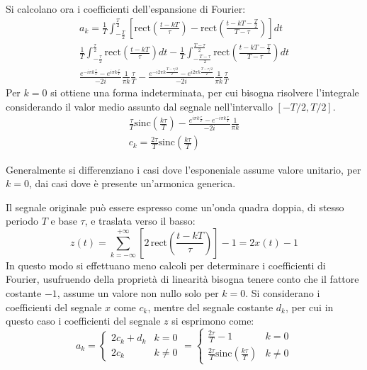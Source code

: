 \documentclass{article}
\numberwithin{equation}{subsection}
\begin{document}
Si calcolano ora i coefficienti dell'espansione di Fourier:
\begin{gather*}
    a_k=\displaystyle\frac{1}{T}\int_{-\frac{T}{2}}^{\frac{T}{2}}\left[\mbox{rect}\left(\frac{t-kT}{\tau}\right)-\mbox{rect}\left(\frac{t-kT-\frac{T}{2}}{T-\tau}\right)\right]dt\\
    \displaystyle\frac{1}{T}\int_{-\frac{\tau}{2}}^{\frac{\tau}{2}}\mbox{rect}\left(\frac{t-kT}{\tau}\right)dt-\frac{1}{T}\int_{-\frac{T-\tau}{2}}^{\frac{T-\tau}{2}}\mbox{rect}\left(\frac{t-kT-\frac{T}{2}}{T-\tau}\right)dt\\
    \displaystyle\frac{e^{-i\pi k\frac{\tau}{T}}-e^{i\pi k\frac{\tau}{T}}}{-2i}\frac{1}{\pi k}\frac{\tau}{T}-\frac{e^{-i2\pi k\frac{T-\tau/2}{T}}-e^{i2\pi k\frac{T-\tau/2}{T}}}{-2i}\frac{1}{\pi k}\frac{\tau}{T}
\end{gather*}
Per $k=0$ si ottiene una forma indeterminata, per cui bisogna risolvere l'integrale considerando il valor medio assunto dal segnale nell'intervallo $\left[-T/2,T/2\right]$. 
\begin{gather*}
    \displaystyle\frac{\tau}{T}\mbox{sinc}\left(\frac{k\tau}{T}\right)-\frac{e^{i\pi k\frac{\tau}{T}}-e^{-i\pi k\frac{\tau}{T}}}{-2i}\frac{1}{\pi k}\\
    c_k=\displaystyle\frac{2\tau}{T}\mbox{sinc}\left(\frac{k\tau}{T}\right)
\end{gather*}


Generalmente si differenziano i casi dove l'esponeniale assume valore unitario, per $k=0$, dai casi dove è presente un'armonica generica. 

Il segnale originale può essere espresso come un'onda quadra doppia, di stesso periodo $T$ e base $\tau$, e traslata verso il basso:
\begin{equation*}
    z(t)=\displaystyle\sum_{k=-\infty}^{+\infty}\left[2\,\mbox{rect}\left(\frac{t-kT}{\tau}\right)\right]-1=2x(t)-1
\end{equation*}
In questo modo si effettuano meno calcoli per determinare i coefficienti di Fourier, usufruendo della proprietà di linearità bisogna tenere conto che il fattore costante $-1$, 
assume un valore non nullo solo per $k=0$. Si considerano i coefficienti del segnale $x$ come $c_k$, mentre del segnale costante $d_k$, per cui in questo caso i coefficienti 
del segnale $z$ si esprimono come: 
\begin{equation*}
    a_k=\begin{cases}
        2c_k+d_k &k=0\\
        2c_k&k\neq0
    \end{cases}=\begin{cases}
        \displaystyle\frac{2\tau}{T}-1&k=0\\
        \displaystyle\frac{2\tau}{T}\mbox{sinc}\left(\frac{k\tau}{T}\right)&k\neq0
    \end{cases}
\end{equation*}
\end{document}
